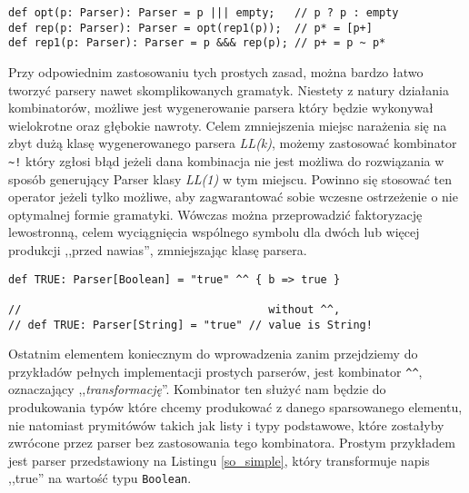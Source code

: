 \begin{lstlisting}[caption={Implementacja parserów opt i rep}, label={optrep}]
def opt(p: Parser): Parser = p ||| empty;   // p ? p : empty
def rep(p: Parser): Parser = opt(rep1(p));  // p* = [p+]
def rep1(p: Parser): Parser = p &&& rep(p); // p+ = p ~ p*
\end{lstlisting}


Przy odpowiednim zastosowaniu tych prostych zasad, można bardzo łatwo tworzyć parsery nawet skomplikowanych gramatyk.
Niestety z natury działania kombinatorów, możliwe jest wygenerowanie parsera który będzie wykonywał wielokrotne oraz głębokie nawroty.
Celem zmniejszenia miejsc narażenia się na zbyt dużą klasę wygenerowanego parsera \textit{LL(k)}, możemy zastosować kombinator \verb|~!|
który zgłosi błąd jeżeli dana kombinacja nie jest możliwa do rozwiązania w sposób generujący Parser klasy \textit{LL(1)} w tym miejscu.
Powinno się stosować ten operator jeżeli tylko możliwe, aby zagwarantować sobie wczesne ostrzeżenie o nie optymalnej formie gramatyki.
Wówczas można przeprowadzić faktoryzację lewostronną, celem wyciągnięcia wspólnego symbolu dla dwóch lub więcej produkcji ,,przed nawias'', zmniejszając klasę parsera.

\begin{lstlisting}[caption={Zastosowanie kombinatora transformującego}, label={so_simple}]
def TRUE: Parser[Boolean] = "true" ^^ { b => true }

//                                      without ^^, 
// def TRUE: Parser[String] = "true" // value is String!

\end{lstlisting}

Ostatnim elementem koniecznym do wprowadzenia zanim przejdziemy do przykładów pełnych implementacji prostych parserów, jest kombinator \verb|^^|,
oznaczający ,,\textit{transformację}''. Kombinator ten służyć nam będzie do produkowania typów które chcemy produkować z danego sparsowanego elementu,
nie natomiast prymitówów takich jak listy i typy podstawowe, które zostałyby zwrócone przez parser bez zastosowania tego kombinatora.
Prostym przykładem jest parser przedstawiony na Listingu \ref{so_simple}, który transformuje napis ,,true'' na wartość typu \verb|Boolean|.



